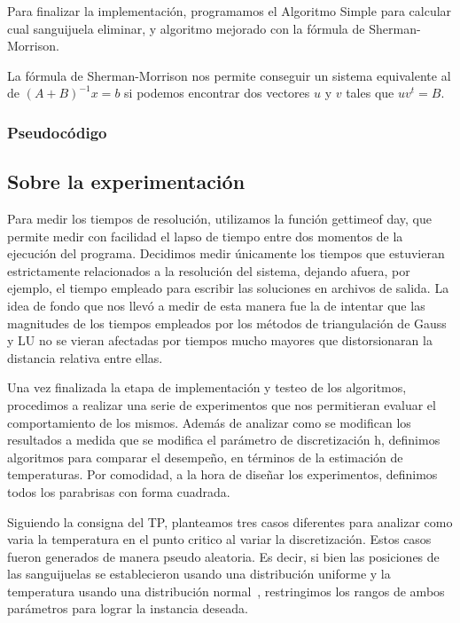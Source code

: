 Para finalizar la implementación, programamos el Algoritmo Simple para calcular cual sanguijuela eliminar,
y algoritmo mejorado con la fórmula de Sherman-Morrison. 


La fórmula de Sherman-Morrison nos permite conseguir un sistema equivalente al de $(A+B)^{-1}x=b$ si podemos encontrar dos vectores $u$ y $v$
tales que $uv^t=B$.



\subsubsection{Pseudocódigo}

\subsection{Sobre la experimentación}

Para medir los tiempos de resolución, utilizamos la función gettimeof day, que permite medir con
facilidad el lapso de tiempo entre dos momentos de la ejecución del programa. Decidimos medir
únicamente los tiempos que estuvieran estrictamente relacionados a la resolución del sistema,
dejando afuera, por ejemplo, el tiempo empleado para escribir las soluciones en archivos de salida. La
idea de fondo que nos llevó a medir de esta manera fue la de intentar que las magnitudes de los tiempos
empleados por los métodos de triangulación de Gauss y LU no se vieran afectadas por tiempos mucho
mayores que distorsionaran la distancia relativa entre ellas.

Una vez finalizada la etapa de implementación y testeo de los algoritmos, procedimos a realizar una
serie de experimentos que nos permitieran evaluar el comportamiento de los mismos. Además de
analizar como se modifican los resultados a medida que se modifica el parámetro de discretización
h, definimos algoritmos para comparar el desempeño, en términos de la estimación de temperaturas.
Por comodidad, a la hora de diseñar los experimentos, definimos todos los parabrisas con forma cuadrada.

Siguiendo la consigna del TP, planteamos tres casos diferentes para analizar como varia la temperatura 
en el punto critico al variar la discretización. Estos casos fueron generados de manera pseudo aleatoria. Es decir, si bien las posiciones de las sanguijuelas se establecieron usando una distribución uniforme y la temperatura usando una distribución normal~\cite{proba}, restringimos los rangos de ambos parámetros para lograr la instancia deseada.


